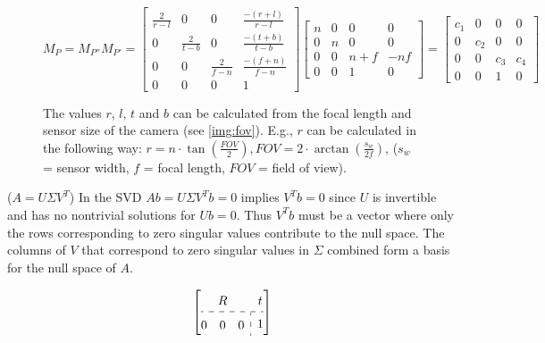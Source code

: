 \documentclass[conference]{IEEEtran}
\begin{document}
\begin{figure}[h]
    \begin{equation} \label{eqn:API_matrix}
        M_{P} = M_{P''} M_{P'} =
        \begin{bmatrix}
            \frac{2}{r - l} & 0               & 0               & \frac{-(r + l)}{r - l} \\
            0               & \frac{2}{t - b} & 0               & \frac{-(t + b)}{t - b} \\
            0               & 0               & \frac{2}{f - n} & \frac{-(f + n)}{f - n} \\
            0               & 0               & 0               & 1
        \end{bmatrix}
        \begin{bmatrix}
            n & 0 & 0     & 0   \\
            0 & n & 0     & 0   \\
            0 & 0 & n + f & -nf \\
            0 & 0 & 1     & 0
        \end{bmatrix}
        =
        \begin{bmatrix}
            c_1 & 0   & 0   & 0   \\
            0   & c_2 & 0   & 0   \\
            0   & 0   & c_3 & c_4 \\
            0   & 0   & 1   & 0
        \end{bmatrix}
    \end{equation}
    \caption[]{The values $r$, $l$, $t$ and $b$ can be calculated from the focal length and sensor size of the camera (see \ref{img:fov}). E.g., $r$ can be calculated in the following way:
        $r = n \cdot \tan\left(\frac{FOV}{2}\right),
            FOV = 2 \cdot \arctan\left(\frac{s_w}{2f}\right)$,
        ($s_w$ = sensor width, $f$ = focal length, $FOV$ = field of view).
    }
\end{figure}

($A = U\Sigma V^{T}$)
\cite{SVD}
In the SVD $Ab = U\Sigma V^{T}b = 0$ implies $V^{T}b = 0$ since $U$ is invertible and has no nontrivial solutions for $Ub = 0$.
Thus $V^{T}b$ must be a vector where only the rows corresponding to zero singular values contribute to the null space.
The columns of $V$ that correspond to zero singular values in $\Sigma$ combined form a basis for the null space of $A$.

\[
    \renewcommand{\arraystretch}{1.5}
    \left[\begin{array}{@{}c:c@{}}
            R                        & t \\ \hdashline
            \begin{array}{@{}ccc@{}}
                0 & 0 & 0
            \end{array} & 1
        \end{array}\right]
\]
\end{document}
